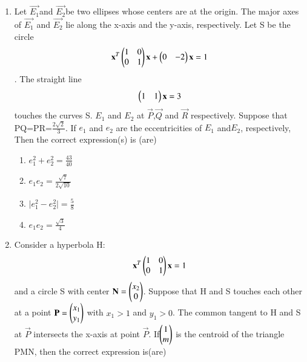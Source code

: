 \begin{enumerate}[label=\arabic*.,ref=\thesubsection.\theenumi]
    \begin{enumerate}
    \item {}
    \item {}
    \item {}
    \item {}
    \end{enumerate}
    \item Let $\vec{E_1}$and $\vec{E_2}$be two ellipses whose centers are at the origin. 					The major axes of $\vec{E_1} $ and $\vec{E_2}$ lie along the x-axis and the 
    y-axis, respectively. Let S be the circle 
    \begin{align}
    \mathbf{x}^T \begin{pmatrix}1& 0 \\0 & 1\end{pmatrix} \mathbf{x}+\begin{pmatrix}0&-2\end{pmatrix}\mathbf{x}=1
    \end{align}.
    The straight line
    \begin{align}
    \begin{pmatrix}1&1\end{pmatrix}\mathbf{x}=3
    \end{align} touches the curves S. $E_1$ and $E_2$ at $\vec{P}$,$\vec{Q}$ and $\vec{R}$ respectively. Suppose that PQ=PR=$\frac{2\sqrt{2}}{3}$. If $e_1$ and $e_2$ are the eccentricities of $E_1$ and$E_2$, respectively, Then the correct expression(s) is (are)
    \begin{enumerate}
    \item $e_1^2+e_2^2=\frac{43}{40}$
    \item $e_1e_2=\frac{\sqrt{7}}{2\sqrt{10}}$
    \item $\mid e_1^2-e_2^2\mid=\frac{5}{8}$
    \item $e_1e_2=\frac{\sqrt{3}}{4}$
    \end{enumerate}
    \item Consider a hyperbola H:
    \begin{align}
    \mathbf{x}^T \begin{pmatrix}1& 0 \\0 & 1\end{pmatrix} \mathbf{x}=1
    \end{align} and a circle S with center $\mathbf{N}=\begin{pmatrix}x_2\\0\end{pmatrix}$. Suppose that H and S touches each other at a point $\mathbf{P}=\begin{pmatrix}x_1\\y_1\end{pmatrix}$ with $x_1>1 $ and $ y_1>0$. The common tangent to   H and S at $\vec{P}$ intersects the x-axis at point $\vec{P}$. If$\begin{pmatrix}1\\m\end{pmatrix}$ is the centroid of the triangle PMN, then the correct expression is(are)

\end{enumerate}
